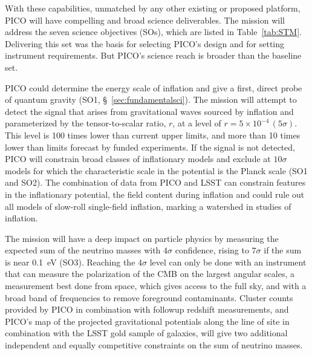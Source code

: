 \documentclass[PICOReport.tex]{subfiles}
\begin{document}
With these capabilities, unmatched by any other existing or proposed platform, PICO will have compelling and broad science deliverables. The mission will address the seven science objectives (SOs), which are listed in Table~\ref{tab:STM}. Delivering this set was the basis for selecting PICO's design and for setting instrument requirements. But PICO's science reach is broader than the baseline set. 

PICO could determine the energy scale of inflation and give a first, direct probe of quantum gravity (SO1, \S~\ref{sec:fundamentalsci}). The mission will attempt to detect the signal that arises from gravitational waves sourced by inflation and parameterized by the tensor-to-scalar ratio, $r$, at a level of $r =5\times10^{-4} \, (5\sigma)$. This level is 100 times lower than current upper limits, and more than 10 times lower than limits forecast by funded experiments.  If the signal is not detected, PICO will constrain broad classes of inflationary models and exclude at $10\sigma$ models for which the characteristic scale in the potential is the Planck scale (SO1 and SO2). The combination of data from PICO and LSST can constrain features in the inflationary potential, the field content during inflation and could rule out all models of slow-roll single-field inflation, marking a watershed in studies of inflation. 

The mission will have a deep impact on particle physics by measuring the expected sum of the neutrino masses with $4\sigma$ confidence, rising to $7\sigma$ if the sum is near 0.1~eV (SO3). Reaching the $4\sigma$ level can only be done with an instrument that can measure the polarization of the CMB on the largest angular scales, a measurement best done from space, which gives access to the full sky, and with a broad band of frequencies to remove foreground contaminants.  
Cluster counts provided by PICO in combination with followup redshift measurements, and PICO's map of the projected gravitational potentials along the line of site in combination with the LSST gold sample of galaxies, will give two additional independent and equally competitive constraints on the sum of neutrino masses. 
\end{document}

